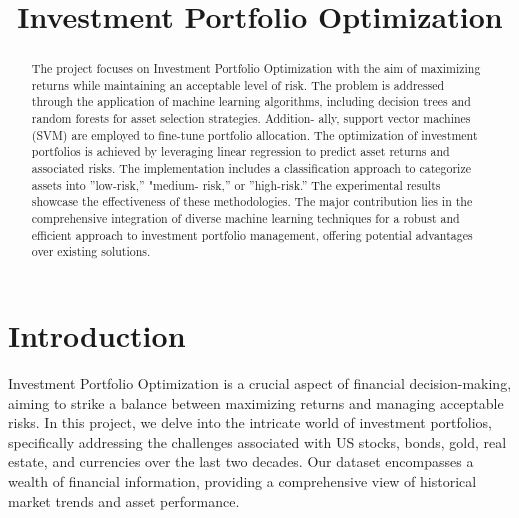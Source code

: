 \documentclass[conference]{IEEEtran}
\begin{document}
\title{Investment Portfolio Optimization}

\author{
\and
{}
\and
{}
}

\maketitle


\begin{abstract}
The project focuses on Investment Portfolio Optimization with the aim of maximizing returns while maintaining an acceptable level of risk. The problem is addressed through the application of machine learning algorithms, including decision trees and random forests for asset selection strategies. Addition- ally, support vector machines (SVM) are employed to fine-tune portfolio allocation. The optimization of investment portfolios is achieved by leveraging linear regression to predict asset returns and associated risks. The implementation includes a classification approach to categorize assets into ”low-risk,” "medium- risk,” or ”high-risk.” The experimental results showcase the effectiveness of these methodologies. The major contribution lies in the comprehensive integration of diverse machine learning techniques for a robust and efficient approach to investment portfolio management, offering potential advantages over existing solutions.
\end{abstract}

\section{Introduction}
Investment Portfolio Optimization is a crucial aspect of financial decision-making, aiming to strike a balance between maximizing returns and managing acceptable risks. In this project, we delve into the intricate world of investment portfolios, specifically addressing the challenges associated with US stocks, bonds, gold, real estate, and currencies over the last two decades. Our dataset encompasses a wealth of financial information, providing a comprehensive view of historical market trends and asset performance.
\end{document}
